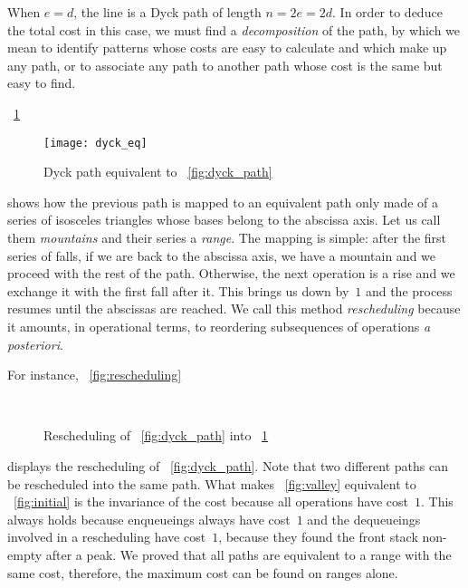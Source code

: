 When \(e=d\), the line is a Dyck path of length \(n=2e=2d\). In order
to deduce the total cost in this case, we must find a
\emph{decomposition} of the path, by
which we mean to identify patterns whose costs are easy to calculate
and which make up any path, or to associate any path to another path
whose cost is the same but easy to find.

\Fig~\ref{fig:dyck_eq}
\begin{figure}[!b]
\centering
\texttt{[image: dyck\_eq]}
\caption{Dyck path equivalent to \fig~\ref{fig:dyck_path}}
\label{fig:dyck_eq}
\end{figure}
shows how the previous path is mapped to an equivalent path only made
of a series of isosceles triangles whose bases belong to the abscissa
axis. Let us call them \emph{mountains} and
their series a \emph{range}. The mapping is
simple: after the first series of falls, if we are back to the
abscissa axis, we have a mountain and we proceed with the rest of the
path. Otherwise, the next operation is a rise and we exchange it with
the first fall after it. This brings us down by~\(1\) and the process
resumes until the abscissas are reached. We call this method
\emph{rescheduling} because it amounts,
in operational terms, to reordering subsequences of operations \emph{a
posteriori}.

For instance, \fig~\vref{fig:rescheduling}
\begin{figure}
\centering
{}
\qquad
{}\\
\qquad
{}
\caption{Rescheduling of \fig~\ref{fig:dyck_path} into \fig~\ref{fig:dyck_eq}}
\label{fig:rescheduling}
\end{figure}
displays the rescheduling of \fig~\vref{fig:dyck_path}. Note that two
different paths can be rescheduled into the same path. What makes
\fig~\ref{fig:valley} equivalent to \fig~\ref{fig:initial} is the
invariance of the cost because all operations have cost~\(1\). This
always holds because enqueueings always have cost~\(1\) and the
dequeueings involved in a rescheduling have cost~\(1\), because they
found the front stack non\hyp{}empty after a peak. We proved that all
paths are equivalent to a range with the same cost, therefore, the
maximum cost can be found on ranges alone.


